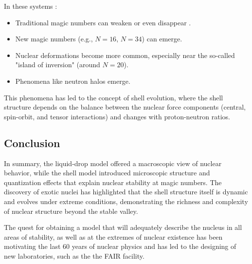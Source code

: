 In these systems \cite{otsuka_evolution_2020}:

\begin{itemize}
	\item Traditional magic numbers can weaken or even disappear .
	\item New magic numbers (e.g., $N=16$, $N=34$) can emerge.
	\item Nuclear deformations become more common, especially near the so-called "island of inversion" (around $N=20$).
	\item Phenomena like neutron halos emerge.
\end{itemize}

This phenomena has led to the concept of shell evolution, where the shell structure depends on the balance between the nuclear force components (central, spin-orbit, and tensor interactions) and changes with proton-neutron ratios.

\subsection{Conclusion}

In summary, the liquid-drop model offered a macroscopic view of nuclear behavior, while the shell model introduced microscopic structure and quantization effects that explain nuclear stability at magic numbers. The discovery of exotic nuclei has highlighted that the shell structure itself is dynamic and evolves under extreme conditions, demonstrating the richness and complexity of nuclear structure beyond the stable valley.

The quest for obtaining a model that will adequately describe the nucleus in all areas of stability, as well as at the extremes of nuclear existence has been motivating the last 60 years of nuclear physics and has led to the designing of new laboratories, such as the the FAIR facility.

%
%

